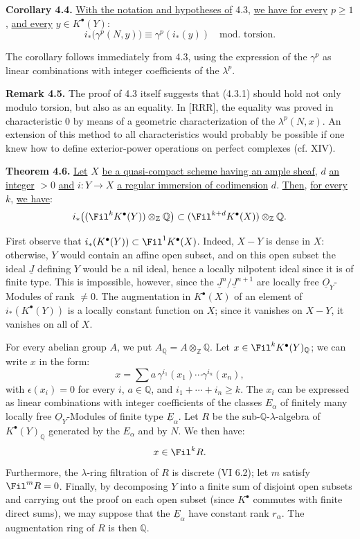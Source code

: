 \textbf{Corollary 4.4.} \uline{With the notation and hypotheses of} 4.3, \uline{we have for every} \(p\ge1\), \uline{and every} \(y\in K^{\bullet}(Y)\):
\[
  i_*\bigl(\gamma^p(N,y)\bigr)\equiv \gamma^p(i_*(y))
  \quad\text{mod.\ torsion}.
\]

The corollary follows immediately from 4.3, using the expression of the \(\gamma^p\) as linear combinations with integer coefficients of the \(\lambda^p\).

\textbf{Remark 4.5.} The proof of 4.3 itself suggests that (4.3.1) should hold not only modulo torsion, but also as an equality. In [RRR], the equality was proved in characteristic \(0\) by means of a geometric characterization of the \(\lambda^p(N,x)\). An extension of this method to all characteristics would probably be possible if one knew how to define exterior-power operations on perfect complexes (cf. XIV).

%
\textbf{Theorem 4.6.}
\uline{Let} \(X\) \uline{be a quasi-compact scheme having an ample sheaf}, \(d\) \uline{an integer} \(>0\) \uline{and} \(i:Y\to X\) \uline{a regular immersion of codimension} \(d\). \uline{Then}, \uline{for every} \(k\), \uline{we have}:
\[
 i_*\bigl((\Fil^kK^{\bullet}(Y))\otimes_{\mathbb Z}\mathbb Q\bigr)
 \subset
 (\Fil^{k+d}K^{\bullet}(X))\otimes_{\mathbb Z}\mathbb Q.
\]

First observe that \(i_*(K^{\bullet}(Y))\subset \Fil^1K^{\bullet}(X)\). Indeed, \(X-Y\) is dense in \(X\): otherwise, \(Y\) would contain an affine open subset, and on this open subset the ideal \(\underline{J}\) defining \(Y\) would be a nil ideal, hence a locally nilpotent ideal since it is of finite type. This is impossible, however, since the \(\underline{J}^n/\underline{J}^{n+1}\) are locally free \(\underline{O}_Y\)-Modules of rank \(\ne0\). The augmentation in \(K^{\bullet}(X)\) of an element of \(i_*(K^{\bullet}(Y))\) is a locally constant function on \(X\); since it vanishes on \(X-Y\), it vanishes on all of \(X\).

For every abelian group \(A\), we put \(A_{\mathbb Q}=A\otimes_{\mathbb Z}\mathbb Q\). Let \(x\in\Fil^kK^{\bullet}(Y)_{\mathbb Q}\); we can write \(x\) in the form:
\[
  x=\sum a\,\gamma^{i_1}(x_1)\cdots\gamma^{i_n}(x_n),
\]
with \(\epsilon(x_i)=0\) for every \(i\), \(a\in\mathbb Q\), and \(i_1+\cdots+i_n\ge k\). The \(x_i\) can be expressed as linear combinations with integer coefficients of the classes \(E_\alpha\) of finitely many locally free \(\underline{O}_Y\)-Modules of finite type \(\underline{E}_\alpha\). Let \(R\) be the sub-\(\mathbb Q\)-\(\lambda\)-algebra of \(K^{\bullet}(Y)_{\mathbb Q}\) generated by the \(E_\alpha\) and by \(N\). We then have:
\[
  x\in\Fil^kR.
\]
Furthermore, the \(\lambda\)-ring filtration of \(R\) is discrete (VI 6.2); let \(m\) satisfy \(\Fil^mR=0\). Finally, by decomposing \(Y\) into a finite sum of disjoint open subsets and carrying out the proof on each open subset (since \(K^{\bullet}\) commutes with finite direct sums), we may suppose that the \(\underline{E}_\alpha\) have constant rank \(r_\alpha\). The augmentation ring of \(R\) is then \(\mathbb Q\).

